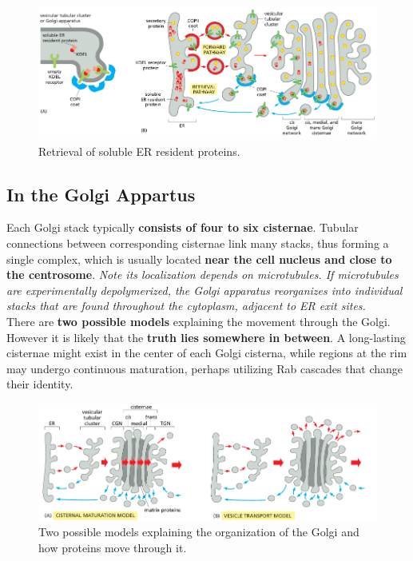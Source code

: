 \documentclass[../main.tex]{subfiles}
\begin{document}
\begin{figure}[H]
	\centering
	\includegraphics[width= \textwidth]{20}
	\caption{Retrieval of soluble ER resident proteins.}
\end{figure}

\subsection{In the Golgi Appartus}
Each Golgi stack typically \textbf{consists of four to six cisternae}. Tubular connections between corresponding cisternae link many stacks, thus forming a single complex, which is usually located \textbf{near the cell nucleus and close to the centrosome}. \textit{Note its localization depends on microtubules. If microtubules are experimentally depolymerized, the Golgi apparatus reorganizes into individual stacks that are found throughout the cytoplasm, adjacent to ER exit sites.} \\
\indent There are \textbf{two possible models} explaining the movement through the Golgi. However it is likely that the \textbf{truth lies somewhere in between}. A long-lasting cisternae might exist in the center of each Golgi cisterna, while regions at the rim may undergo continuous maturation, perhaps utilizing Rab cascades that change their identity.
\begin{figure}[H]
	\centering
	\includegraphics[width= 0.75 \textwidth]{26}
	\caption{Two possible models explaining the organization of the Golgi and how proteins move through it.}
\end{figure}
\end{document}
